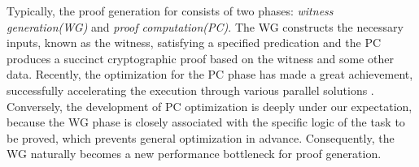 






Typically, the proof generation for \zk consists of two phases:  \textit{witness generation(WG)} and \textit{proof computation(PC)}. The WG  constructs the necessary inputs, known as the witness, satisfying a specified predication and the PC produces a succinct cryptographic proof based on the witness and some other data. Recently, the optimization for the PC phase has made a great achievement, successfully accelerating the execution through various parallel solutions \cite{botrel2023faster, chen2024load, zhang2021pipezk, ma2023gzkp, ji2024accelerating}. Conversely, the development of PC optimization is deeply under our expectation, because the WG phase is closely associated with the specific logic of the task to be proved, which prevents general optimization in advance. 
Consequently, the WG naturally becomes a new performance bottleneck for proof generation.




